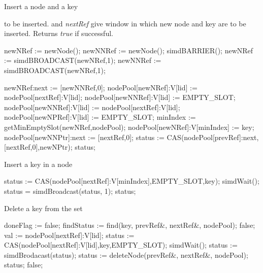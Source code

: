 \documentclass[11pt,onecolumn]{IEEEtran}
\begin{document}
\begin{algorithm}
  \caption{Insert a node and a key}
  \label{alg:insnodekey}
  \begin{algorithmic}[1]
    \Require
       to be inserted.
       and {\it nextRef} give window in which new node
              and key are to be inserted.
    \Ensure
       \Statex Returns {\it true} if successful.
    
        \State newNRef := newNode();
        \State newNNRef := newNode();
      \EndIf
      \State simdBARRIER();
      \State newNRef  := simdBROADCAST(newNRef,1);
      \State newNNRef := simdBROADCAST(newNRef,1);      
      
      \State newNRef:next := [newNNRef,0];
        \State nodePool[newNRef]:V[lid] := nodePool[nextRef]:V[lid];
        \State nodePool[newNNRef]:V[lid] := EMPTY\_SLOT;
      \Else
        \State nodePool[newNNRef]:V[lid] := nodePool[nextRef]:V[lid];
        \State nodePool[newNPRef]:V[lid] := EMPTY\_SLOT;
      \EndIf
      \State minIndex := getMinEmptySlot(newNRef,nodePool);
      \State nodePool[newNRef]:V[minIndex] := key;
      \State nodePool[newNNPtr]:next := [nextRef,0];
      \State status := CAS(nodePool[prevRef]:next,[nextRef,0],newNPtr);
      \Return status;
    \EndFunction
  \end{algorithmic}
\end{algorithm}

\begin{algorithm}
  \caption{Insert a key in a node}
  \label{alg:inskey}
  \begin{algorithmic}[5]  
        \State status := CAS(nodePool[nextRef]:V[minIndex],EMPTY\_SLOT,key);
      \EndIf
      \State simdWait();
      \State status = simdBroadcast(status, 1);
      \Return status;
    \EndFunction
  \end{algorithmic}
\end{algorithm}

\begin{algorithm}
  \caption{Delete a key from the set}
  \label{alg:delkey}
  \begin{algorithmic}[5]  
      \State doneFlag := false;
        \State findStatus := find(key, prevRef\&, nextRef\&, nodePool);
          \State
          \Return false;
        \EndIf
        \State val   := nodePool[nextRef]:V[lid];
          \State status := CAS(nodePool[nextRef]:V[lid],key,EMPTY\_SLOT);
        \EndIf
        \State simdWait();
        \State status := simdBrodacast(status);
          \State status := deleteNode(prevRef\&, nextRef\&, nodePool);
          \Return status;
        \Else
          \State
          \Return false;
        \EndIf
      \EndWhile
    \EndFunction
  \end{algorithmic}
\end{algorithm}
\end{document}
